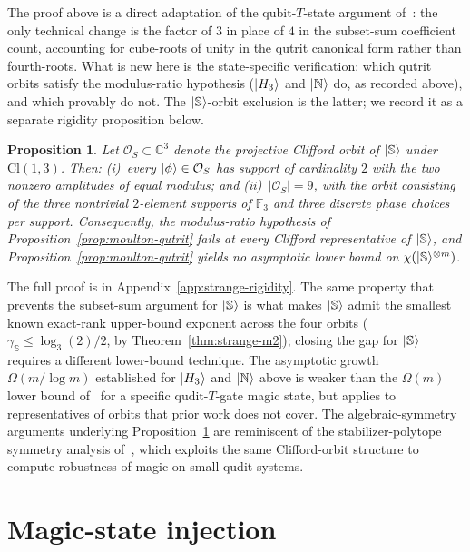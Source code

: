 \documentclass[11pt]{article}
\newtheorem{prop}[theorem]{Proposition}
\theoremstyle{definition}
\newcommand{\microspace}{\mspace{0.5mu}}
\newcommand{\ket}[1]{\lvert\microspace #1 \microspace \rangle}
\newcommand{\complex}{\mathbb{C}}
\newcommand{\F}{\mathcal{F}}
\renewcommand{\F}[1]{\mathbb{F}_{#1}}
\newcommand{\chiR}{\chi}
\newcommand{\Strange}{\ket{\mathbb{S}}}
\newcommand{\Hth}{\ket{H_3}}
\newcommand{\Norrell}{\ket{\mathbb{N}}}
\newcommand{\Cl}{\mathrm{Cl}}
\begin{document}
	The proof above is a direct adaptation of the qubit-$T$-state
	argument of~\cite[Theorem~3.1]{lovitz2022techniques}: the only
	technical change is the factor of $3$ in place of $4$ in the
	subset-sum coefficient count, accounting for cube-roots of unity in
	the qutrit canonical form rather than fourth-roots. What is new
	here is the state-specific verification: which qutrit orbits
	satisfy the modulus-ratio hypothesis ($\Hth$ and $\Norrell$
	do, as recorded above), and which provably do not. The
	$\Strange$-orbit exclusion is the latter; we record it as a
	separate rigidity proposition below.
	
	\begin{prop}\label{prop:strange-rigidity}
		Let $\mathcal{O}_S \subset \complex^3$ denote the projective
		Clifford orbit of $\Strange$ under $\Cl(1, 3)$. Then:
		(i)~every $\ket\phi \in \mathcal{O}_S$ has support of cardinality
		$2$ with the two nonzero amplitudes of equal modulus; and
		(ii)~$|\mathcal{O}_S| = 9$, with the orbit consisting of the three
		nontrivial $2$-element supports of $\F{3}$ and three discrete phase
		choices per support.
		Consequently, the modulus-ratio hypothesis of
		Proposition~\ref{prop:moulton-qutrit} fails at every Clifford
		representative of $\Strange$, and
		Proposition~\ref{prop:moulton-qutrit} yields no asymptotic lower
		bound on $\chiR(\Strange^{\otimes m})$.
	\end{prop}

	The full proof is in Appendix~\ref{app:strange-rigidity}.
	The same property that prevents the subset-sum argument for
	$\Strange$ is what makes $\Strange$ admit the smallest known
	exact-rank upper-bound exponent across the four orbits
	($\gamma_{\mathbb{S}} \le \log_3(2)/2$, by Theorem~\ref{thm:strange-m2});
	closing the gap for $\Strange$ requires a different lower-bound
	technique. The asymptotic growth
	$\Omega(m / \log m)$ established for $\Hth$ and $\Norrell$ above is
	weaker than the $\Omega(m)$ lower bound
	of~\cite{labib2022stabilizer} for a specific qudit-$T$-gate magic
	state, but applies to representatives of orbits that prior work
	does not cover. The algebraic-symmetry arguments underlying
	Proposition~\ref{prop:strange-rigidity} are reminiscent of the
	stabilizer-polytope symmetry analysis
	of~\cite{heinrich2019robustness}, which exploits the same
	Clifford-orbit structure to compute robustness-of-magic on small
	qudit systems.
	
	\section{Magic-state injection}\label{sec:injection}
	
\end{document}
